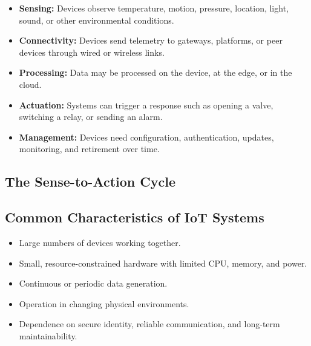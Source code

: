 \documentclass[11pt,a4paper]{article}
\begin{document}
\begin{itemize}[leftmargin=*]
  \item \textbf{Sensing:} Devices observe temperature, motion, pressure, location, light, sound, or other environmental conditions.
  \item \textbf{Connectivity:} Devices send telemetry to gateways, platforms, or peer devices through wired or wireless links.
  \item \textbf{Processing:} Data may be processed on the device, at the edge, or in the cloud.
  \item \textbf{Actuation:} Systems can trigger a response such as opening a valve, switching a relay, or sending an alarm.
  \item \textbf{Management:} Devices need configuration, authentication, updates, monitoring, and retirement over time.
\end{itemize}

\subsection{The Sense-to-Action Cycle}

\begin{center}
\end{center}

\subsection{Common Characteristics of IoT Systems}

\begin{itemize}[leftmargin=*]
  \item Large numbers of devices working together.
  \item Small, resource-constrained hardware with limited CPU, memory, and power.
  \item Continuous or periodic data generation.
  \item Operation in changing physical environments.
  \item Dependence on secure identity, reliable communication, and long-term maintainability.
\end{itemize}
\end{document}
